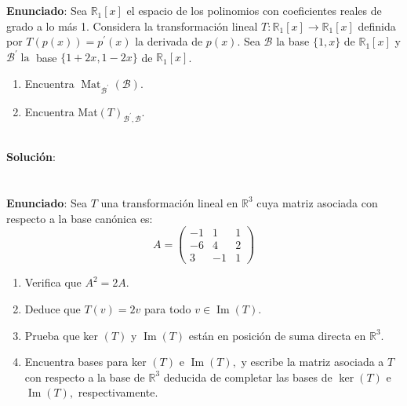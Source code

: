 \documentclass{article} %
\begin{document}
\section{}

\textbf{Enunciado}: Sea $\mathbb{R}_{1}[x]$ el espacio de los polinomios con coeficientes reales de grado a lo más 1. Considera la transformación lineal $T: \mathbb{R}_{1}[x] \rightarrow \mathbb{R}_{1}[x]$ definida por $T(p(x))=p^{\prime}(x)$ la derivada de $p(x) .$ Sea $\mathcal{B}$ la base $\{1, x\}$ de $\mathbb{R}_{1}[x]$ y $\mathcal{B}^{\prime} \operatorname{la}$
base $\{1+2 x, 1-2 x\}$ de $\mathbb{R}_{1}[x]$.

\begin{enumerate}[label=(\alph*)]
\item Encuentra $\operatorname{Mat}_{\mathcal{B}^{\prime}}(\mathcal{B})$.
\item  Encuentra Mat$(T)_{\mathcal{B}^{\prime}, \mathcal{B}}$.

\end{enumerate}


\\
\vspace{10 mm}
\textbf{Solución}:


				

\section{}

\textbf{Enunciado}: Sea $T$ una transformación lineal en $\mathbb{R}^{3}$ cuya matriz asociada con respecto a la base canónica es:
$$
A=\left(\begin{array}{ccc}
-1 & 1 & 1 \\
-6 & 4 & 2 \\
3 & -1 & 1
\end{array}\right)
$$

\begin{enumerate}[label=(\alph*)]
\item Verifica que $A^{2}=2A$.
\item  Deduce que $T(v)=2 v$ para todo $v \in \operatorname{Im}(T)$.
\item  Prueba que ker $(T)$ y $\operatorname{Im}(T)$ están en posición de suma directa en $\mathbb{R}^{3}$.
\item Encuentra bases para ker $(T)$ e $\operatorname{Im}(T),$ y escribe la matriz asociada a $T$ con respecto a la base de $\mathbb{R}^{3}$ deducida de completar las bases de $\operatorname{ker}(T)$ e $\operatorname{Im}(T),$ respectivamente.

\end{enumerate}
\end{document}
